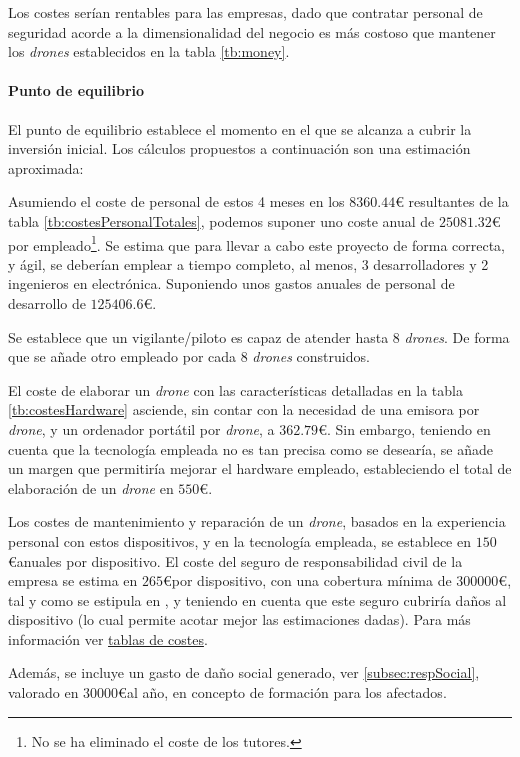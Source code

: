 Los costes serían rentables para las empresas, dado que contratar personal de seguridad acorde a la dimensionalidad del negocio es más costoso que mantener los \emph{drones} establecidos en la tabla \ref{tb:money}.

\paragraph{Punto de equilibrio} El punto de equilibrio establece el momento en el que se alcanza a cubrir la inversión inicial. Los cálculos propuestos a continuación son una estimación aproximada: 

Asumiendo el coste de personal de estos 4 meses en los $8360.44$\euro{} resultantes de la tabla \ref{tb:costesPersonalTotales}, podemos suponer uno coste anual de $25081.32$\euro{} por empleado\footnote{No se ha eliminado el coste de los tutores.}. 
Se estima que para llevar a cabo este proyecto de forma correcta, y ágil, se deberían emplear a tiempo completo, al menos, 3 desarrolladores y 2 ingenieros en electrónica. Suponiendo unos gastos anuales de personal de desarrollo de $125406.6$\euro.

Se establece que un vigilante/piloto es capaz de atender hasta 8 \emph{drones}. De forma que se añade otro empleado por cada 8 \emph{drones} construidos.

El coste de elaborar un \emph{drone} con las características detalladas en la tabla \ref{tb:costesHardware} asciende, sin contar con la necesidad de una emisora por \emph{drone}, y un ordenador portátil por \emph{drone}, a $362.79$\euro. Sin embargo, teniendo en cuenta que la tecnología empleada no es tan precisa como se desearía, se añade un margen que permitiría mejorar el hardware empleado, estableciendo el total de elaboración de un \emph{drone} en $550$\euro. 

Los costes de mantenimiento y reparación de un \emph{drone}, basados en la experiencia personal con estos dispositivos, y en la tecnología empleada, se establece en $150$\euro anuales por dispositivo. El coste del seguro de responsabilidad civil de la empresa se estima en $265$\euro por dispositivo, con una cobertura mínima de $300000$\euro, tal y como se estipula en \citep{wiki:respCivil}, y teniendo en cuenta que este seguro cubriría daños al dispositivo (lo cual permite acotar mejor las estimaciones dadas). Para más información ver \href{https://www.aenus.es/responsabilidad-civil-danos-profesional/}{tablas de costes}. 

Además, se incluye un gasto de daño social generado, ver \ref{subsec:respSocial}, valorado en $30000$\euro al año, en concepto de formación para los afectados.


